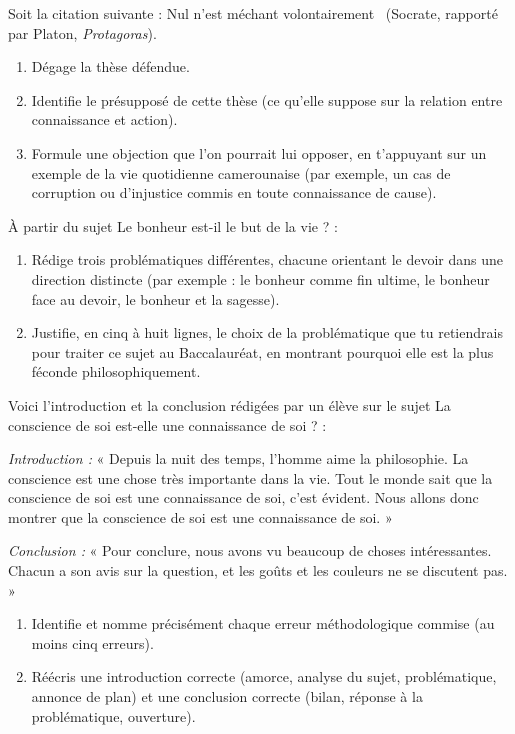 \documentclass[11pt]{article}
\begin{document}
\begin{exercice}
Soit la citation suivante : \guillemotleft Nul n'est méchant volontairement \guillemotright\ (Socrate, rapporté par Platon, \emph{Protagoras}).
\begin{enumerate}
\item Dégage la thèse défendue.
\item Identifie le présupposé de cette thèse (ce qu'elle suppose sur la relation entre connaissance et action).
\item Formule une objection que l'on pourrait lui opposer, en t'appuyant sur un exemple de la vie quotidienne camerounaise (par exemple, un cas de corruption ou d'injustice commis en toute connaissance de cause).
\end{enumerate}
\end{exercice}

\begin{exercice}
À partir du sujet \guillemotleft Le bonheur est-il le but de la vie ? \guillemotright :
\begin{enumerate}
\item Rédige trois problématiques différentes, chacune orientant le devoir dans une direction distincte (par exemple : le bonheur comme fin ultime, le bonheur face au devoir, le bonheur et la sagesse).
\item Justifie, en cinq à huit lignes, le choix de la problématique que tu retiendrais pour traiter ce sujet au Baccalauréat, en montrant pourquoi elle est la plus féconde philosophiquement.
\end{enumerate}
\end{exercice}

\begin{exercice}
Voici l'introduction et la conclusion rédigées par un élève sur le sujet \guillemotleft La conscience de soi est-elle une connaissance de soi ? \guillemotright :

\emph{Introduction :} « Depuis la nuit des temps, l'homme aime la philosophie. La conscience est une chose très importante dans la vie. Tout le monde sait que la conscience de soi est une connaissance de soi, c'est évident. Nous allons donc montrer que la conscience de soi est une connaissance de soi. »

\emph{Conclusion :} « Pour conclure, nous avons vu beaucoup de choses intéressantes. Chacun a son avis sur la question, et les goûts et les couleurs ne se discutent pas. »

\begin{enumerate}
\item Identifie et nomme précisément chaque erreur méthodologique commise (au moins cinq erreurs).
\item Réécris une introduction correcte (amorce, analyse du sujet, problématique, annonce de plan) et une conclusion correcte (bilan, réponse à la problématique, ouverture).
\end{enumerate}
\end{exercice}
\end{document}
